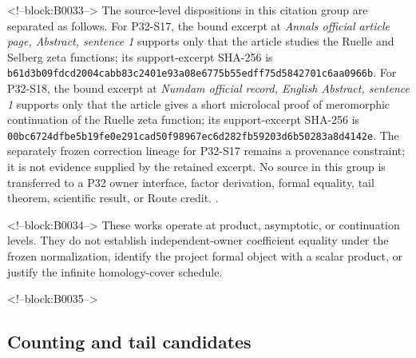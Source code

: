 \documentclass[11pt]{article}
\begin{document}
<!--block:B0033-->
The source-level dispositions in this citation group are separated as follows.
For P32-S17, the bound excerpt at \emph{Annals official article page, Abstract, sentence 1} supports only that the article studies the Ruelle and Selberg zeta functions; its support-excerpt SHA-256 is \texttt{b61d3b09\allowbreak{}fdcd2004\allowbreak{}cabb83c2\allowbreak{}401e93a0\allowbreak{}8e6775b5\allowbreak{}5edff75d\allowbreak{}5842701c\allowbreak{}6aa0966b}.
For P32-S18, the bound excerpt at \emph{Numdam official record, English Abstract, sentence 1} supports only that the article gives a short microlocal proof of meromorphic continuation of the Ruelle zeta function; its support-excerpt SHA-256 is \texttt{00bc6724\allowbreak{}dfbe5b19\allowbreak{}fe0e291c\allowbreak{}ad50f989\allowbreak{}67ec6d28\allowbreak{}2fb59203\allowbreak{}d6b50283\allowbreak{}a8d4142e}.
The separately frozen correction lineage for P32-S17 remains a provenance constraint; it is not evidence supplied by the retained excerpt.
No source in this group is transferred to a P32 owner interface, factor derivation, formal equality, tail theorem, scientific result, or Route credit.
\citep{P32-S17,P32-S18}.

<!--block:B0034-->
These works operate at product, asymptotic, or continuation levels. They
do not establish independent-owner coefficient equality under the frozen
normalization, identify the project formal object with a scalar product,
or justify the infinite homology-cover schedule.

<!--block:B0035-->
\hypertarget{24-counting-and-tail-candidates}{%
\subsection{Counting and tail
candidates}\label{24-counting-and-tail-candidates}}
\end{document}

